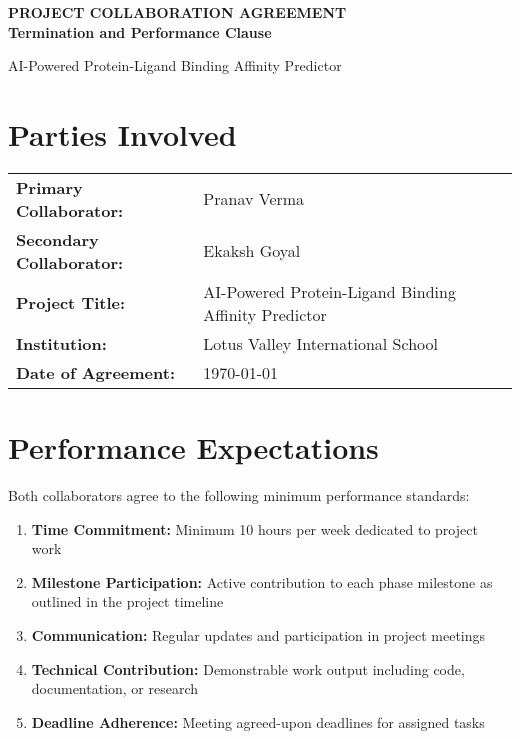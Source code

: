 \documentclass[12pt,a4paper]{article}
\begin{document}
\begin{center}
{\Large\bfseries PROJECT COLLABORATION AGREEMENT}\\
{\large\bfseries Termination and Performance Clause}
\vspace{0.5cm}

{\normalsize AI-Powered Protein-Ligand Binding Affinity Predictor}\\
\end{center}

\vspace{1cm}

\section*{Parties Involved}

\begin{tabular}{ll}
\textbf{Primary Collaborator:} & Pranav Verma \\
\textbf{Secondary Collaborator:} & Ekaksh Goyal \\
\textbf{Project Title:} & AI-Powered Protein-Ligand Binding Affinity Predictor \\
\textbf{Institution:} & Lotus Valley International School \\
\textbf{Date of Agreement:} & \today
\end{tabular}

\vspace{1cm}

\section*{Performance Expectations}

Both collaborators agree to the following minimum performance standards:

\begin{enumerate}
    \item \textbf{Time Commitment:} Minimum 10 hours per week dedicated to project work
    \item \textbf{Milestone Participation:} Active contribution to each phase milestone as outlined in the project timeline
    \item \textbf{Communication:} Regular updates and participation in project meetings
    \item \textbf{Technical Contribution:} Demonstrable work output including code, documentation, or research
    \item \textbf{Deadline Adherence:} Meeting agreed-upon deadlines for assigned tasks
\end{enumerate}
\end{document}
